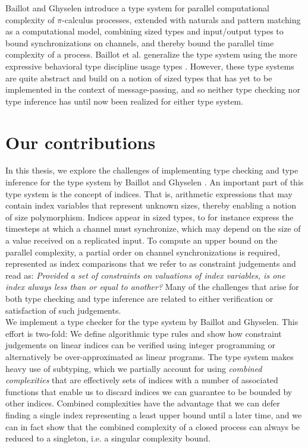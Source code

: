 Baillot and Ghyselen \cite{BaillotGhyselen2021} introduce a type system for parallel computational complexity of $\pi$-calculus processes, extended with naturals and pattern matching as a computational model, combining sized types and input/output types to bound synchronizations on channels, and thereby bound the parallel time complexity of a process. Baillot et al. \cite{BaillotEtAl2021} generalize the type system using the more expressive behavioral type discipline usage types \cite{Kobayashi1998,KobayashiEtAl2000}. However, these type systems are quite abstract and build on a notion of sized types that has yet to be implemented in the context of message-passing, and so neither type checking nor type inference has until now been realized for either type system.

\section{Our contributions}
In this thesis, we explore the challenges of implementing type checking and type inference for the type system by Baillot and Ghyselen \cite{BaillotGhyselen2021}. An important part of this type system is the concept of indices. That is, arithmetic expressions that may contain index variables that represent unknown sizes, thereby enabling a notion of size polymorphism. Indices appear in sized types, to for instance express the timesteps at which a channel must synchronize, which may depend on the size of a value received on a replicated input. To compute an upper bound on the parallel complexity, a partial order on channel synchronizations is required, represented as index comparisons that we refer to as constraint judgements and read as: \textit{Provided a set of constraints on valuations of index variables, is one index always less than or equal to another?} Many of the challenges that arise for both type checking and type inference are related to either verification or satisfaction of such judgements.\\%

We implement a type checker for the type system by Baillot and Ghyselen. This effort is two-fold: We define algorithmic type rules and show how constraint judgements on linear indices can be verified using integer programming or alternatively be over-approximated as linear programs. The type system makes heavy use of subtyping, which we partially account for using \textit{combined complexities} that are effectively sets of indices with a number of associated functions that enable us to discard indices we can guarantee to be bounded by other indices. Combined complexities have the advantage that we can defer finding a single index representing a least upper bound until a later time, and we can in fact show that the combined complexity of a closed process can always be reduced to a singleton, i.e. a singular complexity bound.\\

